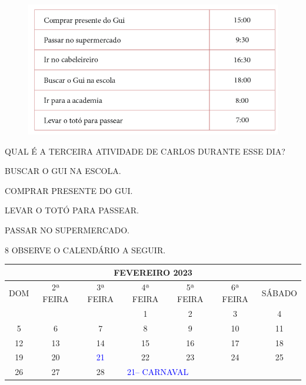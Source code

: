 \begin{figure}[htpb!]
\centering
\includegraphics[width=.6\textwidth]{../ilustracoes/MAT1/SAEB_1ANO_MAT_FIGURA115.png}
\end{figure}

QUAL É A TERCEIRA ATIVIDADE DE CARLOS DURANTE ESSE DIA?

\begin{escolha}
\item BUSCAR O GUI NA ESCOLA.

\item COMPRAR PRESENTE DO GUI.

\item LEVAR O TOTÓ PARA PASSEAR.

\item PASSAR NO SUPERMERCADO.
\end{escolha}


\pagebreak
\num{8} OBSERVE O CALENDÁRIO A SEGUIR.

\begin{tabular}{|ccccccc|}
\hline
\multicolumn{7}{|c|}{FEVEREIRO 2023} \\ \hline
\multicolumn{1}{|c|}{DOM} & \multicolumn{1}{c|}{2ª FEIRA} & \multicolumn{1}{c|}{3ª FEIRA} & \multicolumn{1}{c|}{4ª FEIRA} & \multicolumn{1}{c|}{5ª FEIRA} & \multicolumn{1}{c|}{6ª FEIRA} & SÁBADO \\ \hline
\multicolumn{1}{|c|}{} & \multicolumn{1}{c|}{} & \multicolumn{1}{c|}{} & \multicolumn{1}{c|}{1} & \multicolumn{1}{c|}{2} & \multicolumn{1}{c|}{3} & 4 \\ \hline
\multicolumn{1}{|c|}{5} & \multicolumn{1}{c|}{6} & \multicolumn{1}{c|}{7} & \multicolumn{1}{c|}{8} & \multicolumn{1}{c|}{9} & \multicolumn{1}{c|}{10} & 11 \\ \hline
\multicolumn{1}{|c|}{12} & \multicolumn{1}{c|}{13} & \multicolumn{1}{c|}{14} & \multicolumn{1}{c|}{15} & \multicolumn{1}{c|}{16} & \multicolumn{1}{c|}{17} & 18 \\ \hline
\multicolumn{1}{|c|}{19} & \multicolumn{1}{c|}{20} & \multicolumn{1}{c|}{\textcolor{blue}{21}} & \multicolumn{1}{c|}{22} & \multicolumn{1}{c|}{23} & \multicolumn{1}{c|}{24} & 25 \\ \hline
\multicolumn{1}{|c|}{26} & \multicolumn{1}{c|}{27} & \multicolumn{1}{c|}{28} & \multicolumn{4}{l|}{\textcolor{blue}{21-- CARNAVAL}} \\ \hline
\end{tabular}\bigskip

